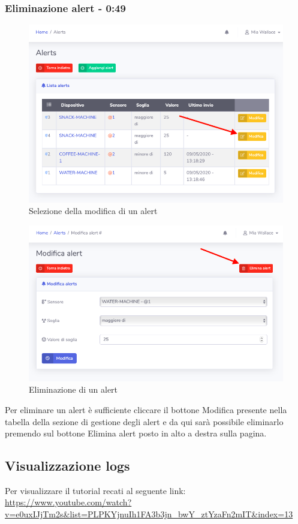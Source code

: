 	\subsubsection{Eliminazione alert - 0:49}
	\begin{figure}[H]
		\centering
		\includegraphics[scale=0.600]{res/images/mod/selModAlert.png}
		\caption{Selezione della modifica di un alert}
	\end{figure}
	\begin{figure}[H]
		\centering
		\includegraphics[scale=0.600]{res/images/mod/elimAlert.png}
		\caption{Eliminazione di un alert}
	\end{figure}
		Per eliminare un alert è sufficiente cliccare il bottone Modifica presente nella tabella della sezione di gestione degli alert e da qui sarà possibile eliminarlo premendo sul bottone Elimina alert posto in alto a destra sulla pagina.
	

\subsection{Visualizzazione logs}
Per visualizzare il tutorial recati al seguente link: 
\url{https://www.youtube.com/watch?v=e0uxIJjTm2s&list=PLPKYjnuIh1FA3b3jn_bwY_ztYzaFn2mIT&index=13}

